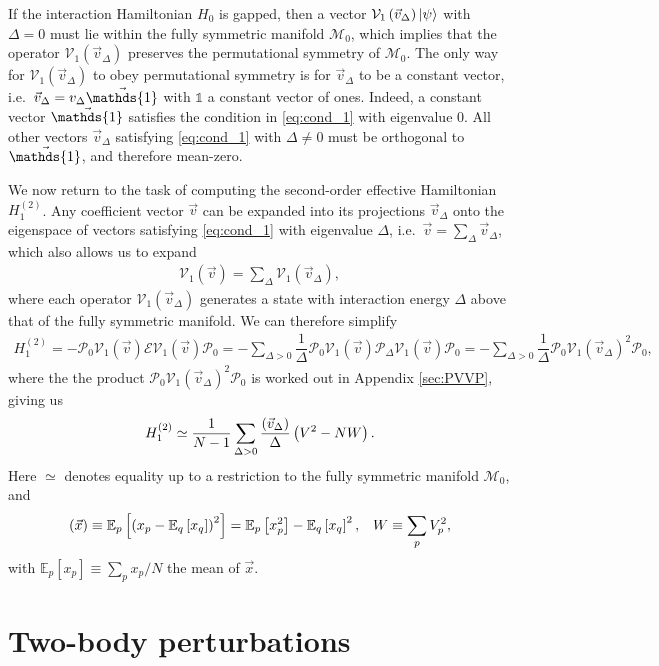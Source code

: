 \documentclass[nofootinbib,notitlepage,11pt]{revtex4-2}
\newcommand{\f}[2]{\dfrac{#1}{#2}} %
\newcommand{\p}[1]{\left(#1\right)} %
\renewcommand{\sp}[1]{\left[#1\right]} %
\renewcommand{\v}{\vec} %
\newcommand{\1}{\mathds{1}}
\newcommand{\E}{\mathcal{E}}
\newcommand{\M}{\mathcal{M}}
\renewcommand{\P}{\mathcal{P}}
\newcommand{\V}{\mathcal{V}}
\newcommand{\EE}{\mathbb{E}}
\let\var\relax
\DeclareMathOperator{\var}{var}
\begin{document}
If the interaction Hamiltonian $H_0$ is gapped, then a vector
$\V_1\p{\v v_\Delta}\ket\psi$ with $\Delta=0$ must lie within the
fully symmetric manifold $\M_0$, which implies that the operator
$\V_1\p{\v v_\Delta}$ preserves the permutational symmetry of $\M_0$.
The only way for $\V_1\p{\v v_\Delta}$ to obey permutational symmetry
is for $\v v_\Delta$ to be a constant vector,
i.e.~$\v v_\Delta=v_\Delta\v\1$ with $\1$ a constant vector of ones.
Indeed, a constant vector $\v\1$ satisfies the condition in
\eqref{eq:cond_1} with eigenvalue $0$.  All other vectors
$\v v_\Delta$ satisfying \eqref{eq:cond_1} with $\Delta\ne0$ must be
orthogonal to $\v\1$, and therefore mean-zero.

We now return to the task of computing the second-order effective
Hamiltonian $H_1^{(2)}$.  Any coefficient vector $\v v$ can be
expanded into its projections $\v v_\Delta$ onto the eigenspace of
vectors satisfying \eqref{eq:cond_1} with eigenvalue $\Delta$,
i.e.~$\v v = \sum_\Delta \v v_\Delta$, which also allows us to expand
\begin{align}
  \V_1\p{\v v} = \sum_\Delta \V_1\p{\v v_\Delta},
\end{align}
where each operator $\V_1\p{\v v_\Delta}$ generates a state with
interaction energy $\Delta$ above that of the fully symmetric
manifold.  We can therefore simplify
\begin{align}
  H_1^{(2)}
  = -\P_0 \V_1\p{\v v} \E \V_1\p{\v v} \P_0
  = - \sum_{\Delta>0} \f1{\Delta}
  \P_0 \V_1\p{\v v} \P_\Delta \V_1\p{\v v} \P_0
  = - \sum_{\Delta>0} \f1{\Delta} \P_0 \V_1\p{\v v_\Delta}^2 \P_0,
\end{align}
where the the product $\P_0 \V_1\p{\v v_\Delta}^2 \P_0$ is worked out
in Appendix \ref{sec:PVVP}, giving us
\begin{align}
  H_1^{(2)} \simeq \f1{N-1} \sum_{\Delta>0}
  \f{\var\p{\v v_\Delta}}{\Delta} \p{V^2 - N W}.
  \label{eq:H_1_2}
\end{align}
Here $\simeq$ denotes equality up to a restriction to the fully
symmetric manifold $\M_0$, and
\begin{align}
  \var\p{\v x} \equiv \EE_p\sp{\p{x_p-\EE_q\sp{x_q}}^2}
  = \EE_p\sp{x_p^2} - \EE_q\sp{x_q}^2,
  &&
  W \equiv \sum_p V_p^2,
\end{align}
with $\EE_p\sp{x_p}\equiv\sum_px_p/N$ the mean of $\v x$.

\section{Two-body perturbations}
\end{document}
